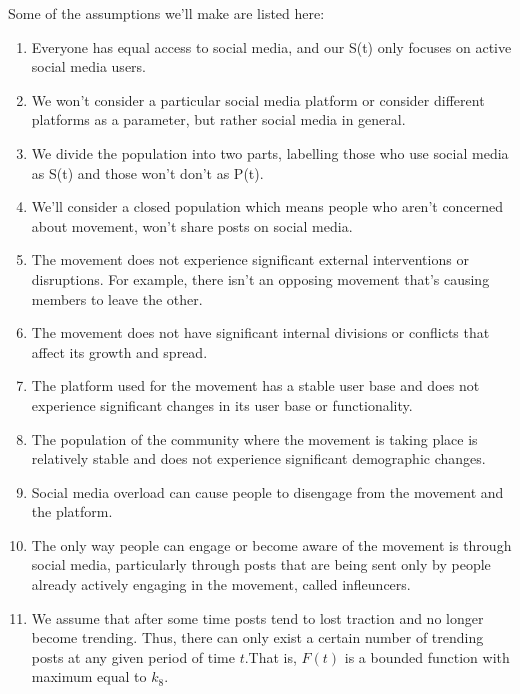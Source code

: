 \documentclass{article}
\begin{document}
    Some of the assumptions we'll make are listed here:
    \begin{enumerate}
    \item  Everyone has equal access to social media, and our S(t) only focuses on active social media users.
    
    \item We won't consider a particular social media platform or consider different platforms as a parameter, but rather social media in general. 
    
    \item We divide the population into two parts, labelling those who use social media as S(t) and those won't don't as P(t). 
    
    \item We'll consider a closed population which means people who aren't concerned about movement, won't share posts on social media. 
    
    \item The movement does not experience significant external interventions or disruptions. For example, there isn't an opposing movement that's causing members to leave the other. 
    
    \item The movement does not have significant internal divisions or conflicts that affect its growth and spread.
    
    \item The platform used for the movement has a stable user base and does not experience significant changes in its user base or functionality.

    \item The population of the community where the movement is taking place is relatively stable and does not experience significant demographic changes.

    \item Social media overload can cause people to disengage from the movement and the platform.
    
    \item  The only way people can engage or become aware of the movement is through social media, particularly through posts that are being sent only by people already actively engaging in the movement, called infleuncers. 
    
    \item  We assume that after some time posts tend to lost traction and no longer become trending. Thus, there can only exist a certain number of trending posts at any given period of time $t$.That is, $F(t)$ is a bounded function with maximum equal to $k_8$. 


\end{enumerate}
\end{document}
